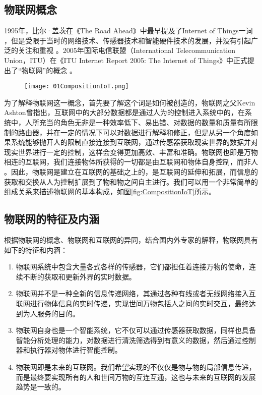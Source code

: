 	\subsection{物联网概念}
1995年，比尔·盖茨在《The Road Ahead》中最早提及了Internet of Things一词\supercite{BillGate1995} ，但是受限于当时的网络技术、传感器技术和智能硬件技术的发展，并没有引起广泛的关注和重视\supercite{HeYong2016} 。2005年国际电信联盟（International Telecommunication Union，ITU）在《ITU Internet Report 2005: The Internet of Things》中正式提出了“物联网”的概念\supercite{HeYong2016,ITU2005} 。

	\begin{figure}[!htbp]
  		\centering
 		\texttt{[image: 01CompositionIoT.png]}
	\end{figure}
为了解释物联网这一概念，首先要了解这个词是如何被创造的，物联网之父Kevin Ashton曾指出，互联网中的大部分数据都是通过人为的控制进入系统中的，在系统中，人所充当的角色无非是一种效率低下、易出错、对数据的数量和质量有所限制的路由器，并在一定的情况下可以对数据进行解释和修正，但是从另一个角度如果系统能够抛开人的限制直接连接到互联网，通过传感器获取现实世界的数据并对现实世界进行一定的控制，这样会变得更加高效、丰富和准确。物联网也即是万物相连的互联网，我们连接物体所获得的一切都是由互联网和物体自身控制，而非人\supercite{Peter2015} 。因此，物联网是建立在互联网的基础之上的，是互联网的延伸和拓展，而信息的获取和交换从人为控制扩展到了物和物之间自主进行。我们可以用一个非常简单的组成关系来描述物联网的基本构成，如图\ref{fig:CompositionIoT}所示。
	
	\subsection{物联网的特征及内涵}
根据物联网的概念、物联网和互联网的异同，结合国内外专家的解释，物联网具有如下的特征和内涵：
	\begin{enumerate}
  		\item 物联网系统中包含大量各式各样的传感器，它们都担任着连接万物的使命，连续不断的获取和更新外界的实时数据。
  		\item 物联网并不是一种全新的信息传递网络，其通过各种有线或者无线网络接入互联网进行物体信息的实时传递，实现世间万物包括人之间的实时交互，最终达到为人服务的目的。
  		\item 物联网自身也是一个智能系统，它不仅可以通过传感器获取数据，同样也具备智能分析处理的能力，对数据进行清洗筛选得到有意义的数据，然后通过控制器和执行器对物体进行智能控制。
  		\item 物联网即是未来的互联网。我们希望实现的不仅仅是物与物的局部信息传递，而是最终要实现所有的人和世间万物的互连互通，这也与未来的互联网的发展趋势是一致的。
	\end{enumerate}
	
